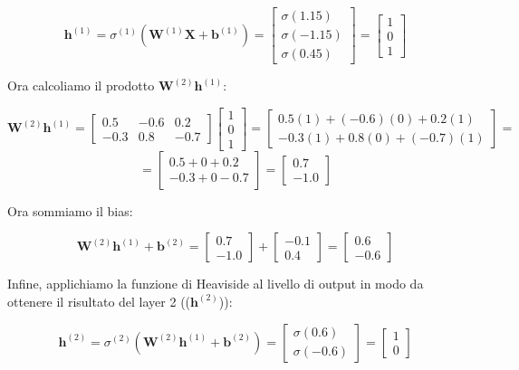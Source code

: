 \[
\mathbf{h}^{(1)} =
\sigma^{(1)}\left( \mathbf{W}^{(1)} \mathbf{X} + \mathbf{b}^{(1)} \right) =
\begin{bmatrix}
\sigma(1.15) \\
\sigma(-1.15) \\
\sigma(0.45)
\end{bmatrix}
=
\begin{bmatrix}
1 \\
0 \\
1
\end{bmatrix}
\]


Ora calcoliamo il prodotto \(\mathbf{W}^{(2)} \mathbf{h}^{(1)}\):

\[
\mathbf{W}^{(2)} \mathbf{h}^{(1)} = 
\begin{bmatrix}
0.5 & -0.6 & 0.2 \\
-0.3 & 0.8 & -0.7
\end{bmatrix}
\begin{bmatrix}
1 \\ 0 \\ 1
\end{bmatrix}
=
\begin{bmatrix}
0.5(1) + (-0.6)(0) + 0.2(1) \\
-0.3(1) + 0.8(0) + (-0.7)(1)
\end{bmatrix}
=
\]
\[
= 
\begin{bmatrix}
0.5 + 0 + 0.2 \\
-0.3 + 0 - 0.7
\end{bmatrix}
=
\begin{bmatrix}
0.7 \\ -1.0
\end{bmatrix}
\]

Ora sommiamo il bias:

\[
\mathbf{W}^{(2)} \mathbf{h}^{(1)} + \mathbf{b}^{(2)} = 
\begin{bmatrix}
0.7 \\ -1.0
\end{bmatrix}
+
\begin{bmatrix}
-0.1 \\ 0.4
\end{bmatrix}
=
\begin{bmatrix}
0.6 \\ -0.6
\end{bmatrix}
\]

Infine, applichiamo la funzione di Heaviside al livello di output
in modo da ottenere il risultato del layer 2 (($\mathbf{h}^{(2)}$)):

\[
\mathbf{h}^{(2)}=
\sigma^{(2)}\left( \mathbf{W}^{(2)} \mathbf{h}^{(1)} + \mathbf{b}^{(2)} \right) =
\begin{bmatrix}
\sigma(0.6) \\
\sigma(-0.6)
\end{bmatrix}
=
\begin{bmatrix}
1 \\
0
\end{bmatrix}
\]

